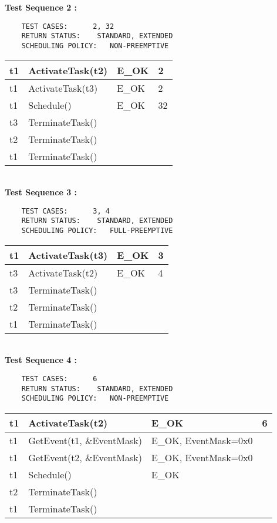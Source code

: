\documentclass[10pt]{article}
\newlength{\Li}\settowidth{\Li}{Running}
\newlength{\Lii}\setlength{\Lii}{7cm}
\newlength{\Liiii}\setlength{\Liiii}{0.9cm}
\newlength{\Liii}\setlength{\Liii}{\textwidth} \addtolength{\Liii}{-\Li} \addtolength{\Liii}{-\Lii} \addtolength{\Liii}{-\Liiii}
\begin{document}
	\textbf{Test Sequence 2 :}
	\begin{lstlisting}
	TEST CASES:		 2, 32
	RETURN STATUS:	  STANDARD, EXTENDED
	SCHEDULING POLICY:   NON-PREEMPTIVE
	\end{lstlisting}
	

	\begin{supertabular}{|p{\Li}|p{\Lii}|p{\Liii}|p{\Liiii}|} \hline 
	t1	& ActivateTask(t2) 		& E\_OK 	& 2 \\ \hline 
	t1 	& ActivateTask(t3)		& E\_OK 	& 2 \\ \hline
	t1	& Schedule() 				& E\_OK	& 32 \\ \hline
	t3	& TerminateTask() 			&		& \\ \hline
	t2	& TerminateTask() 			&		& \\ \hline
	t1	& TerminateTask()  			&		& \\ \hline
	\end{supertabular} \\

	\textbf{Test Sequence 3 :}
	\begin{lstlisting}
	TEST CASES:		 3, 4
	RETURN STATUS:	  STANDARD, EXTENDED
	SCHEDULING POLICY:   FULL-PREEMPTIVE
	\end{lstlisting}
	

	\begin{supertabular}{|p{\Li}|p{\Lii}|p{\Liii}|p{\Liiii}|} \hline 
	t1	& ActivateTask(t3) 		& E\_OK 	& 3 \\ \hline 
	t3 	& ActivateTask(t2)		& E\_OK 	& 4 \\ \hline
	t3	& TerminateTask() 			&		& \\ \hline
	t2	& TerminateTask() 			&		& \\ \hline
	t1	& TerminateTask()  			&		& \\ \hline
	\end{supertabular} \\
	
	\textbf{Test Sequence 4 :}
	\begin{lstlisting}
	TEST CASES:		 6
	RETURN STATUS:	  STANDARD, EXTENDED
	SCHEDULING POLICY:   NON-PREEMPTIVE
	\end{lstlisting}
	

	\begin{supertabular}{|p{\Li}|p{\Lii}|p{\Liii}|p{\Liiii}|} \hline 
	t1	& ActivateTask(t2) 			& E\_OK 				& 6 \\ \hline 
	t1 	& GetEvent(t1, \&EventMask) 	& E\_OK, EventMask=0x0	& \\ \hline
	t1 	& GetEvent(t2, \&EventMask) 	& E\_OK, EventMask=0x0	& \\ \hline
	t1	& Schedule() 					& E\_OK				& \\ \hline
	t2	& TerminateTask()  				&					& \\ \hline
	t1	& TerminateTask() 				&					& \\ \hline
	\end{supertabular} \\
\end{document}
